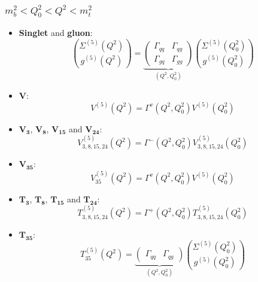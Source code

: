 \documentclass[10pt,a4paper]{article}
\begin{document}
\subsubsection{$m_b^2<Q_0^2<Q^2<m_t^2$}
\begin{itemize}
\item \textbf{Singlet} and \textbf{gluon}:
\begin{equation}
{\Sigma^{(5)}(Q^2) \choose g^{(5)}(Q^2)} =\underbrace{\begin{pmatrix} \Gamma_{qq}& \Gamma_{qg} \\ \Gamma_{gq}& \Gamma_{gg}\end{pmatrix}}_{(Q^2,Q_0^2)}{\Sigma^{(5)}(Q_0^2) \choose g^{(5)}(Q_0^2)}
\end{equation}
\item $\mathbf{V}$:
\begin{equation}
V^{(5)}(Q^2)=\Gamma^{v}(Q^2,Q_0^2)V^{(5)}(Q^2_0)
\end{equation}
\item $\mathbf{V_3}$, $\mathbf{V_8}$, $\mathbf{V_{15}}$ and $\mathbf{V_{24}}$:
\begin{equation}
V^{(5)}_{3,8,15,24}(Q^2)=\Gamma^{-}(Q^2,Q_0^2)V^{(5)}_{3,8,15,24}(Q^2_0)
\end{equation}
\item $\mathbf{V_{35}}$:
\begin{equation}
V_{35}^{(5)}(Q^2)=\Gamma^{v}(Q^2,Q^2_0)V^{(5)}(Q_0^2)
\end{equation}
\item $\mathbf{T_3}$, $\mathbf{T_8}$, $\mathbf{T_{15}}$ and $\mathbf{T_{24}}$:
\begin{equation}
T^{(5)}_{3,8,15,24}(Q^2)=\Gamma^{+}(Q^2,Q_0^2)T^{(5)}_{3,8,15,24}(Q^2_0)
\end{equation}
\item $\mathbf{T_{35}}$:
\begin{equation}
T_{35}^{(5)}(Q^2) = \underbrace{\begin{pmatrix} \Gamma_{qq} & \Gamma_{qg}\end{pmatrix}}_{(Q^2,Q_0^2)}{\Sigma^{(5)}(Q_0^2) \choose g^{(5)}(Q_0^2)}
\end{equation}
\end{itemize}
\end{document}

